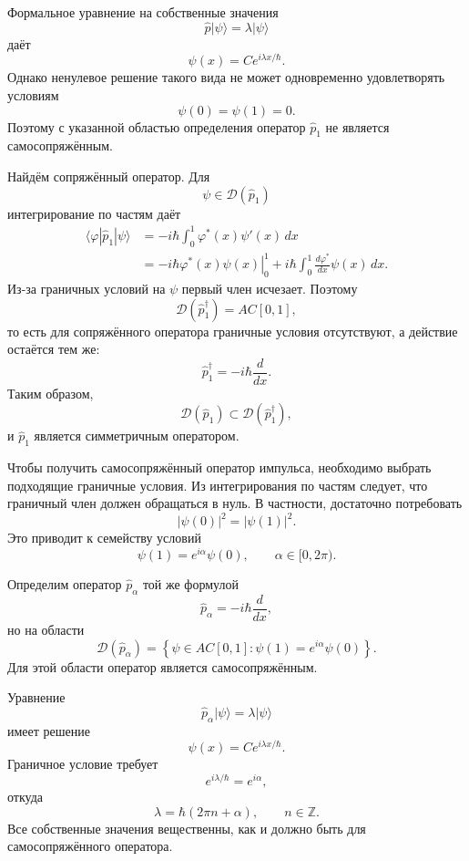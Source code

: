 \documentclass[12pt,a4paper]{article}
\begin{document}
Формальное уравнение на собственные значения
\[
    \hat p|\psi\rangle
    =
    \lambda|\psi\rangle
\]
даёт
\[
    \psi(x)
    =
    C e^{i\lambda x/\hbar}.
\]
Однако ненулевое решение такого вида не может одновременно
удовлетворять условиям
\[
    \psi(0)=\psi(1)=0.
\]
Поэтому с указанной областью определения оператор $\hat p_1$ не
является самосопряжённым.

Найдём сопряжённый оператор. Для
\[
    \psi\in\mathcal D(\hat p_1)
\]
интегрирование по частям даёт
\begin{align*}
    \langle\varphi|\hat p_1|\psi\rangle
    &=
    -i\hbar
    \int_0^1
        \varphi^*(x)\psi'(x)\,dx \\
    &=
    -i\hbar
    \left.
        \varphi^*(x)\psi(x)
    \right|_0^1
    +
    i\hbar
    \int_0^1
        \frac{d\varphi^*}{dx}\psi(x)\,dx.
\end{align*}
Из-за граничных условий на $\psi$ первый член исчезает. Поэтому
\[
    \mathcal D(\hat p_1^\dagger)
    =
    AC[0,1],
\]
то есть для сопряжённого оператора граничные условия отсутствуют, а
действие остаётся тем же:
\[
    \hat p_1^\dagger
    =
    -i\hbar\frac{d}{dx}.
\]
Таким образом,
\[
    \mathcal D(\hat p_1)
    \subset
    \mathcal D(\hat p_1^\dagger),
\]
и $\hat p_1$ является симметричным оператором.

Чтобы получить самосопряжённый оператор импульса, необходимо выбрать
подходящие граничные условия. Из интегрирования по частям следует, что
граничный член должен обращаться в нуль. В частности, достаточно
потребовать
\[
    |\psi(0)|^2=|\psi(1)|^2.
\]
Это приводит к семейству условий
\[
    \boxed{
        \psi(1)=e^{i\alpha}\psi(0),
        \qquad
        \alpha\in[0,2\pi)
    }.
\]

Определим оператор $\hat p_\alpha$ той же формулой
\[
    \hat p_\alpha
    =
    -i\hbar\frac{d}{dx},
\]
но на области
\[
    \boxed{
    \mathcal D(\hat p_\alpha)
    =
    \left\{
        \psi\in AC[0,1]:
        \psi(1)=e^{i\alpha}\psi(0)
    \right\}
    }.
\]
Для этой области оператор является самосопряжённым.

Уравнение
\[
    \hat p_\alpha|\psi\rangle
    =
    \lambda|\psi\rangle
\]
имеет решение
\[
    \psi(x)=Ce^{i\lambda x/\hbar}.
\]
Граничное условие требует
\[
    e^{i\lambda/\hbar}=e^{i\alpha},
\]
откуда
\[
    \boxed{
        \lambda
        =
        \hbar(2\pi n+\alpha),
        \qquad
        n\in\mathbb Z
    }.
\]
Все собственные значения вещественны, как и должно быть для
самосопряжённого оператора.
\end{document}
